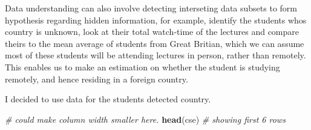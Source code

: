 \documentclass[]{article}
\newenvironment{Shaded}{\begin{snugshade}}{\end{snugshade}}
\newcommand{\KeywordTok}[1]{\textcolor[rgb]{0.13,0.29,0.53}{\textbf{#1}}}
\newcommand{\DecValTok}[1]{\textcolor[rgb]{0.00,0.00,0.81}{#1}}
\newcommand{\StringTok}[1]{\textcolor[rgb]{0.31,0.60,0.02}{#1}}
\newcommand{\CommentTok}[1]{\textcolor[rgb]{0.56,0.35,0.01}{\textit{#1}}}
\newcommand{\OperatorTok}[1]{\textcolor[rgb]{0.81,0.36,0.00}{\textbf{#1}}}
\newcommand{\NormalTok}[1]{#1}
\begin{document}
\begin{Shaded}
\end{Shaded}

Data understanding can also involve detecting interseting data subsets
to form hypothesis regarding hidden information, for example, identify
the students whos country is unknown, look at their total watch-time of
the lectures and compare theirs to the mean average of students from
Great Britian, which we can assume most of these students will be
attending lectures in person, rather than remotely. This enables us to
make an estimation on whether the student is studying remotely, and
hence residing in a foreign country.

I decided to use data for the students detected country.

\begin{Shaded}
\begin{Highlighting}[]
\CommentTok{# could make column width smaller here.}
\KeywordTok{head}\NormalTok{(cse) }\CommentTok{# showing first 6 rows}
\end{Highlighting}
\end{Shaded}
\end{document}
